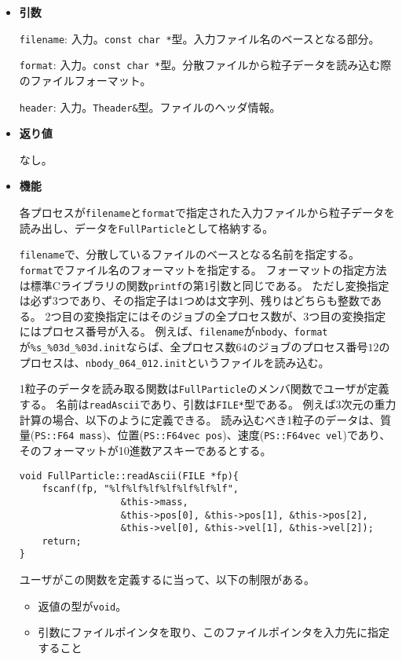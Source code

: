 \begin{itemize}

\item{{\bf 引数}}

{\tt filename}: 入力。{\tt const char *}型。入力ファイル名のベースとなる部分。

{\tt format}: 入力。{\tt const char *}型。分散ファイルから粒子データを読み込む際のファイルフォーマット。

{\tt header}: 入力。{\tt Theader\&}型。ファイルのヘッダ情報。

\item{{\bf 返り値}}

なし。

\item{{\bf 機能}}

各プロセスが{\tt filename}と{\tt format}で指定された入力ファイルから粒子データを読み出し、データを{\tt FullParticle}として格納する。

{\tt filename}で、分散しているファイルのベースとなる名前を指定する。
{\tt format}でファイル名のフォーマットを指定する。
フォーマットの指定方法は標準Cライブラリの関数\verb|printf|の第1引数と同じである。
ただし変換指定は必ず3つであり、その指定子は1つめは文字列、残りはどちらも整数である。
2つ目の変換指定にはそのジョブの全プロセス数が、3つ目の変換指定にはプロセス番号が入る。
例えば、{\tt filename}が\verb|nbody|、{\tt format}が\verb|%s_%03d_%03d.init|ならば、全プロセス数$64$のジョブのプロセス番号$12$のプロセスは、\verb|nbody_064_012.init|というファイルを読み込む。

1粒子のデータを読み取る関数は{\tt FullParticle}のメンバ関数でユーザが定義する。
名前は{\tt readAscii}であり、引数は{\tt FILE*}型である。
例えば3次元の重力計算の場合、以下のように定義できる。
読み込むべき1粒子のデータは、質量(\verb|PS::F64 mass|)、位置(\verb|PS::F64vec pos|)、速度(\verb|PS::F64vec vel|)であり、そのフォーマットが10進数アスキーであるとする。

\begin{verbatim}
void FullParticle::readAscii(FILE *fp){
    fscanf(fp, "%lf%lf%lf%lf%lf%lf%lf",
                  &this->mass,
                  &this->pos[0], &this->pos[1], &this->pos[2],
                  &this->vel[0], &this->vel[1], &this->vel[2]);
    return;
}
\end{verbatim}

ユーザがこの関数を定義するに当って、以下の制限がある。
\begin{itemize}
\item 返値の型が\verb|void|。
\item 引数にファイルポインタを取り、このファイルポインタを入力先に指定すること
\end{itemize}


\end{itemize}
